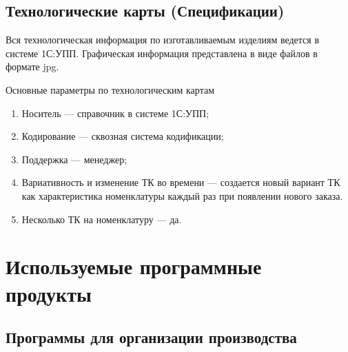 \subsection{Технологические карты (Спецификации)}

Вся технологическая информация по изготавливаемым изделиям ведется в системе 1С:УПП. 
Графическая информация представлена в виде файлов в формате jpg. 




Основные параметры по технологическим картам
\begin{enumerate}
\item Носитель --- справочник в системе 1С:УПП;
\item Кодирование ---  сквозная система кодификации;
\item Поддержка --- менеджер;
\item Вариативность и изменение ТК во времени --- создается новый вариант ТК как характеристика номенклатуры каждый раз при появлении нового заказа.
\item Несколько ТК на номенклатуру --- да.
\end{enumerate}



\section{Используемые программные продукты}

\subsection{Программы для организации производства}

